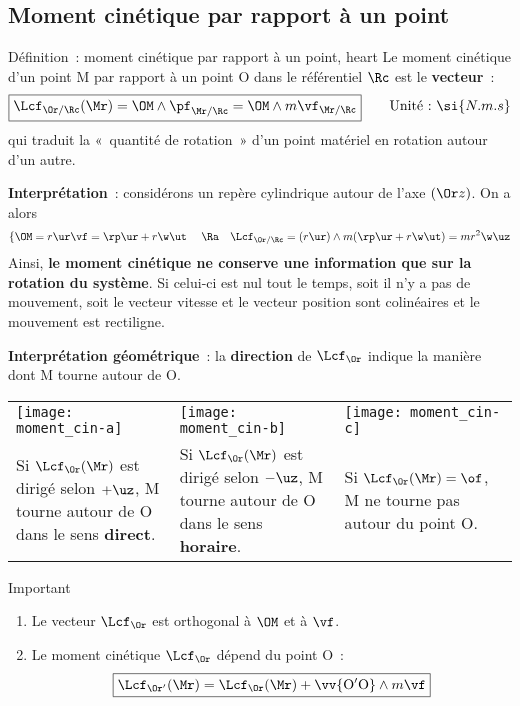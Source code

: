 \documentclass[../main/main.tex]{subfiles}
\begin{document}
\subsection{Moment cinétique par rapport à un point}
\begin{tdefi}{Définition~: moment cinétique par rapport à un point, heart}
    Le moment cinétique d'un point M par rapport à un point O dans le
    référentiel $\Rc$ est le \textbf{vecteur}~:
    \[
        \boxed{\Lcf_{\Or/\Rc}(\Mr) = \OM\wedge\pf_{\Mr/\Rc} = \OM\wedge
        m\vf_{\Mr/\Rc}}
        \qquad
        \text{Unité~:~}
        \si{N.m.s}
    \]
    qui traduit la «~quantité de rotation~» d'un point matériel en rotation
    autour d'un autre.
\end{tdefi}

\textbf{Interprétation}~: considérons un repère cylindrique autour de l'axe
$(\Or z)$. On a alors
\[
    \left\{
        \OM = r\ur\\
        \vf = \rp\ur + r\w\ut
    \right.
    \quad\Ra\quad
    \Lcf_{\Or/\Rc} = (r\ur)\wedge m(\rp\ur+r\w\ut) = mr^2\w\uz
\]
Ainsi, \textbf{le moment cinétique ne conserve une information que sur la
rotation du système}. Si celui-ci est nul tout le temps, soit il n'y a pas de
mouvement, soit le vecteur vitesse et le vecteur position sont colinéaires et le
mouvement est rectiligne.

\textbf{Interprétation géométrique}~: la \textbf{direction} de $\Lcf_{\Or}$
indique la manière dont M tourne autour de O.
\begin{center}
    \begin{tabularx}{\linewidth}{YYY}
        \texttt{[image: moment\_cin-a]} &
        \texttt{[image: moment\_cin-b]} &
        \texttt{[image: moment\_cin-c]}
        \\
        Si $\Lcf_{\Or}(\Mr)$ est dirigé selon $+\uz$, M tourne autour de O dans
        le sens \textbf{direct}. &
        Si $\Lcf_{\Or}(\Mr)$ est dirigé selon $-\uz$, M tourne autour de O dans
        le sens \textbf{horaire}. &
        Si $\Lcf_{\Or}(\Mr) = \of$, M ne tourne pas autour du point O.
    \end{tabularx}
\end{center}

\begin{rimpo}{Important}
    \begin{enumerate}
        \item Le vecteur $\Lcf_{\Or}$ est orthogonal à $\OM$ et à $\vf$.
        \item Le moment cinétique $\Lcf_{\Or}$ dépend du point O~:
            \[
                \boxed{\Lcf_{\Or'}(\Mr) = \Lcf_{\Or}(\Mr) + \vv{\rm O'O}\wedge
                m\vf}
            \]
    \end{enumerate}
\end{rimpo}
\end{document}
